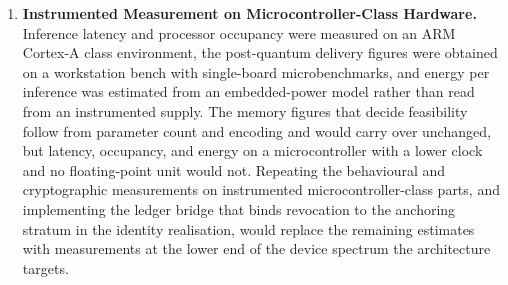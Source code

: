 \begin{enumerate}
\item \textbf{Instrumented Measurement on Microcontroller-Class Hardware.} Inference latency and processor occupancy were measured on an ARM Cortex-A class environment, the post-quantum delivery figures were obtained on a workstation bench with single-board microbenchmarks, and energy per inference was estimated from an embedded-power model rather than read from an instrumented supply. The memory figures that decide feasibility follow from parameter count and encoding and would carry over unchanged, but latency, occupancy, and energy on a microcontroller with a lower clock and no floating-point unit would not. Repeating the behavioural and cryptographic measurements on instrumented microcontroller-class parts, and implementing the ledger bridge that binds revocation to the anchoring stratum in the identity realisation, would replace the remaining estimates with measurements at the lower end of the device spectrum the architecture targets.
\end{enumerate}

